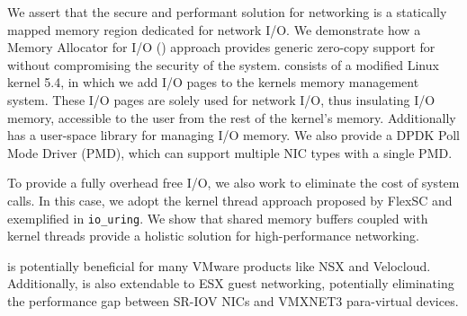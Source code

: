 We assert that the secure and performant solution for networking is a statically mapped memory region dedicated for network I/O. We demonstrate how a Memory Allocator for I/O (\oursys) approach provides generic zero-copy support for \sockets without compromising the security of the system. 
\oursys consists of a modified Linux kernel 5.4, in which we add I/O pages to the kernels memory management system. These I/O pages are solely used for network I/O, thus insulating I/O memory, accessible to the user from the rest of the kernel's memory. Additionally \oursys has a user-space library for managing I/O memory. We also provide a DPDK Poll Mode Driver (PMD), which can support multiple NIC types with a single \oursys PMD.

To provide a fully overhead free I/O, we also work to eliminate the cost of system calls. In this case, we adopt the kernel thread approach proposed by FlexSC\cite{flexsc} and exemplified in \texttt{io\_uring}\cite{io-uring}. We show that shared memory buffers coupled with kernel threads provide a holistic solution for high-performance networking.

\oursys is potentially beneficial for many VMware products like NSX and Velocloud. Additionally, \oursys is also extendable to ESX guest networking, potentially eliminating the performance gap between SR-IOV NICs and VMXNET3 para-virtual devices.